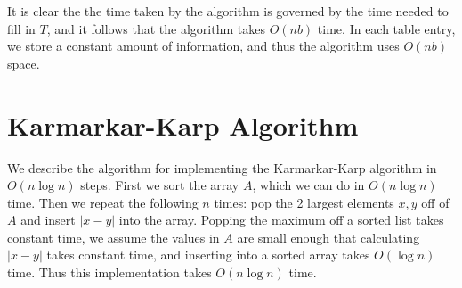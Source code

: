 \documentclass[10pt,letter]{article}
\begin{document}
It is clear the the time taken by the algorithm is governed by the time needed to fill in $T$, and it follows that the algorithm takes $O(nb)$ time. In each table entry, we store a constant amount of information, and thus the algorithm uses $O(nb)$ space. 

\section{Karmarkar-Karp Algorithm}

We describe the algorithm for implementing the Karmarkar-Karp algorithm in $O(n\log{n})$ steps. First we sort the array $A$, which we can do in $O(n\log{n})$ time. Then we repeat the following $n$ times: pop the 2 largest elements $x,y$ off of $A$ and insert $|x-y|$ into the array. Popping the maximum off a sorted list takes constant time, we assume the values in $A$ are small enough that calculating $|x-y|$ takes constant time, and inserting into a sorted array takes $O(\log{n})$ time. Thus this implementation takes $O(n\log{n})$ time.
\end{document}
